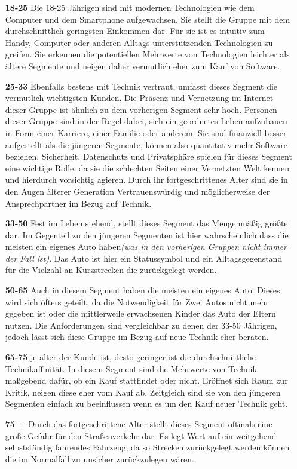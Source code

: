 \begin{itemize}
	\item[\textbf{18-25}] 
	Die 18-25 Jährigen sind mit modernen Technologien wie dem Computer und dem Smartphone aufgewachsen. Sie stellt die Gruppe mit dem durchschnittlich geringsten Einkommen dar. Für sie ist es intuitiv zum Handy, Computer oder anderen Alltags-unterstützenden Technologien zu greifen. Sie erkennen die potentiellen Mehrwerte von Technologien leichter als ältere Segmente und neigen daher vermutlich eher zum Kauf von Software. 
	
	\item[\textbf{25-33}]
	Ebenfalls bestens mit Technik vertraut, umfasst dieses Segment die vermutlich wichtigsten Kunden. Die Präsenz und Vernetzung im Internet dieser Gruppe ist ähnlich zu dem vorherigen Segment sehr hoch. Personen dieser Gruppe sind in der Regel dabei, sich ein geordnetes Leben aufzubauen in Form einer Karriere, einer Familie oder anderem. Sie sind finanziell besser aufgestellt als die jüngeren Segmente, können also quantitativ mehr Software beziehen. Sicherheit, Datenschutz und Privatsphäre spielen für dieses Segment eine wichtige Rolle, da sie die schlechten Seiten einer Vernetzten Welt kennen und hierdurch vorsichtig agieren. Durch ihr fortgeschrittenes Alter sind sie in den Augen älterer Generation Vertrauenswürdig und möglicherweise der Ansprechpartner im Bezug auf Technik.
	\item[\textbf{33-50}]
	Fest im Leben stehend, stellt dieses Segment das Mengenmäßig größte dar. Im Gegenteil zu den jüngeren Segmenten ist hier wahrscheinlich dass die meisten ein eigenes Auto haben\textit{(was in den vorherigen Gruppen nicht immer der Fall ist)}. Das Auto ist hier ein Statussymbol und ein Alltagsgegenstand für die Vielzahl an Kurzstrecken die zurückgelegt werden. 
	\item[\textbf{50-65}]
	Auch in diesem Segment haben die meisten ein eigenes Auto. Dieses wird sich öfters geteilt, da die Notwendigkeit für Zwei Autos nicht mehr gegeben ist oder die mittlerweile erwachsenen Kinder das Auto der Eltern nutzen. Die Anforderungen sind vergleichbar zu denen der 33-50 Jährigen, jedoch lässt sich diese Gruppe im Bezug auf neue Technik eher beraten.
	\item[\textbf{65-75}]
	je älter der Kunde ist, desto geringer ist die durchschnittliche Technikaffinität. In diesem Segment sind die Mehrwerte von Technik maßgebend dafür, ob ein Kauf stattfindet oder nicht. Eröffnet sich Raum zur Kritik, neigen diese eher vom Kauf ab. Zeitgleich sind sie von den jüngeren Segmenten einfach zu beeinflussen wenn es um den Kauf neuer Technik geht. 
	\item[\textbf{75 +}]
	Durch das fortgeschrittene Alter stellt dieses Segment oftmals eine große Gefahr für den Straßenverkehr dar. Es legt Wert auf ein weitgehend selbstständig fahrendes Fahrzeug, da so Strecken zurückgelegt werden können die im Normalfall zu unsicher zurückzulegen wären. 
\end{itemize}
